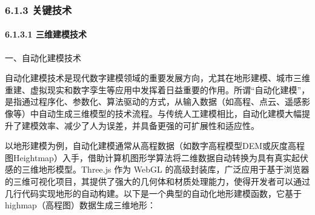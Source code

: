 \hypertarget{ux5173ux952eux6280ux672f}{%
\subsubsection{6.1.3 关键技术}\label{ux5173ux952eux6280ux672f}}

\hypertarget{ux4e09ux7ef4ux5efaux6a21ux6280ux672f}{%
\paragraph{6.1.3.1 三维建模技术}\label{ux4e09ux7ef4ux5efaux6a21ux6280ux672f}}

一、自动化建模技术

自动化建模技术是现代数字建模领域的重要发展方向，尤其在地形建模、城市三维重建、虚拟现实和数字孪生等应用中发挥着日益重要的作用。所谓``自动化建模''，是指通过程序化、参数化、算法驱动的方式，从输入数据（如高程、点云、遥感影像等）中自动生成三维模型的技术流程。与传统人工建模相比，自动化建模大幅提升了建模效率、减少了人为误差，并具备更强的可扩展性和适应性。

以地形建模为例，自动化建模通常从高程数据（如数字高程模型DEM或灰度高程图Heightmap）入手，借助计算机图形学算法将二维数据自动转换为具有真实起伏感的三维地形模型。Three.js 作为 WebGL 的高级封装库，广泛应用于基于浏览器的三维可视化项目，其提供了强大的几何体和材质处理能力，使得开发者可以通过几行代码实现地形的自动构建。以下是一个典型的自动化地形建模函数，它基于 highmap（高程图）数据生成三维地形：

